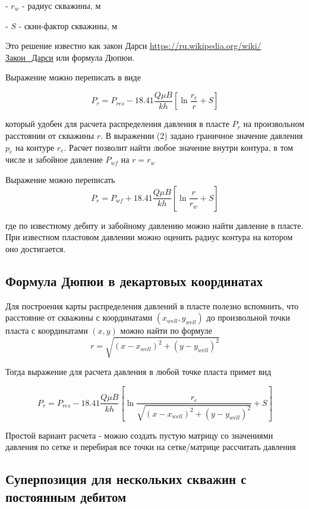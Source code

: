 \documentclass[oneside, openany]{memoir}
\begin{document}
	- $r_w$ - радиус скважины, м
	
	- $S$ - скин-фактор скважины, м
	
	Это решение известно как закон Дарси \url{https://ru.wikipedia.org/wiki/Закон_Дарси} или формула Дюпюи.
	
	Выражение можно переписать в виде
	
	\begin{equation}
		P_{r} = P_{res} - 18.41\dfrac{ Q\mu B }{kh} \left[ \ln\dfrac{r_e}{r} +S \right]
	\end{equation}
	
	который удобен для расчета распределения давления в пласте $P_r$ на произвольном расстоянии от скважины $r$.
	В выражении (2) задано граничное значение давления $p_e$ на контуре $r_e$. Расчет позволит найти любое значение внутри контура, в том числе и забойное давление $P_{wf}$ на $r=r_w$
	
	Выражение можно переписать 
	\begin{equation}
	P_{r} = P_{wf} + 18.41\dfrac{ Q\mu B }{kh} \left[ \ln\dfrac{r}{r_w} +S \right]
	\end{equation}
	
	где по известному дебиту и забойному давлению можно найти давление в пласте. При известном пластовом давлении можно оценить радиус контура на котором оно достигается.
	
	\subsection{Формула Дюпюи в декартовых координатах}
	Для построения карты распределения давлений в пласте полезно вспомнить, что расстояние от скважины с координатами $(x_{well}, y_{well})$ до произвольной точки пласта с координатами $(x,y)$ можно найти по формуле 
	$$r=\sqrt{ (x-x_{well})^2 + (y-y_{well})^2 }$$
	
	Тогда выражение для расчета давления в любой точке пласта примет вид
	
	\begin{equation}
		P_{r} = P_{res} - 18.41\dfrac{ Q\mu B }{kh} \left[ \ln\dfrac{r_e}{\sqrt{ (x-x_{well})^2 + (y-y_{well})^2 }} +S \right]
	\end{equation}
	
	Простой вариант расчета  - можно создать пустую матрицу со значениями давления по сетке и перебирая все точки на сетке/матрице рассчитать давления
	
	\subsection{Суперпозиция для нескольких скважин с постоянным дебитом} 
	
\end{document}
